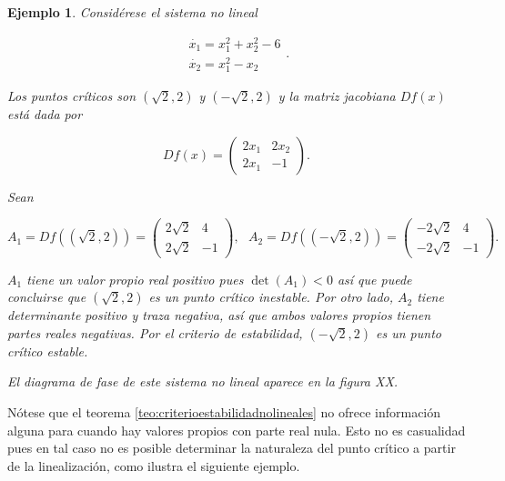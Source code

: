 \documentclass[11pt]{book}
\theoremstyle{definition}
\numberwithin{definition}{section}
\theoremstyle{theorem}
\numberwithin{theorem}{section}
\numberwithin{lemma}{section}
\numberwithin{corollary}{section}
\theoremstyle{plain}
\newtheorem{example}{Ejemplo}
\numberwithin{example}{section}
\begin{document}
\begin{example} \label{ex:nolinealhiperbolico}
Considérese el sistema no lineal

$$ \begin{array}{l} \dot{x_1} = x_1^2 + x_2^2 - 6 \\ \dot{x_2} = x_1^2 - x_2 \end{array}. $$

Los puntos críticos son $(\sqrt{2}, 2)$ y $(-\sqrt{2}, 2)$ y la matriz jacobiana $Df(x)$ está dada por

$$ Df(x) = \left( \begin{array}{ll} 2x_1 & 2x_2 \\ 2x_1 & -1 \end{array} \right).$$

Sean

$$
	A_1 = Df((\sqrt{2},2)) = \left(\begin{array}{ll} 2\sqrt{2} & 4 \\ 2\sqrt{2} & -1 \end{array} \right), \hspace{8pt}
	A_2 = Df((-\sqrt{2},2)) = \left(\begin{array}{ll} -2\sqrt{2} & 4 \\ -2\sqrt{2} & -1 \end{array} \right).	
$$

$A_1$ tiene un valor propio real positivo pues $\det(A_1) < 0$ así que puede concluirse que $(\sqrt{2}, 2)$ es un punto crítico inestable.
Por otro lado, $A_2$ tiene determinante positivo y traza negativa, así que ambos valores propios tienen partes reales negativas. Por el criterio de estabilidad, $(-\sqrt{2},2)$ es un punto crítico estable.

El diagrama de fase de este sistema no lineal aparece en la figura XX.

\end{example}

Nótese que el teorema \ref{teo:criterioestabilidadnolineales} no ofrece información alguna para cuando hay valores propios con parte real nula. Esto no es casualidad pues en tal caso no es posible determinar la naturaleza del punto crítico a partir de la linealización, como ilustra el siguiente ejemplo.
\end{document}
